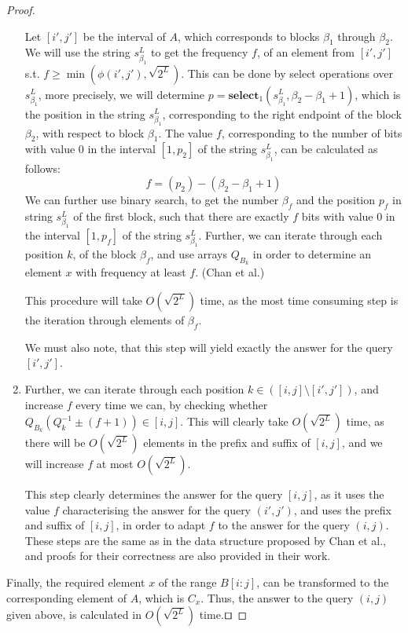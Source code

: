 \documentclass[runningheads]{llncs}
\begin{document}
\begin{proof}
\begin{enumerate}
         Let $[i', j']$ be the interval of $A$, which corresponds to blocks $\beta_1$ through $\beta_2$.
         We will use the string $s^L_{\beta_1}$ to get the frequency $f$, of an element from $[i',j']$ s.t. $f \geq \min( \phi(i',j'),\sqrt{2^L} )$.
         This can be done by select operations over $s^L_{\beta_1}$, more precisely, we will determine $p=\textbf{select}_1(s^L_{\beta_1}, \beta_2-\beta_1+1 )$, 
         which is the position in the string $s^L_{\beta_1}$, corresponding to the right endpoint of the block $\beta_2$, with respect to block $\beta_1$. 
        The value $f$, corresponding to the number of bits with value $0$ in the interval $[1 , p_2]$ of the string $s^L_{\beta_1}$, can be calculated as follows:
         \[
            f = (p_2)-(\beta_2-\beta_1+1)
         \]
        We can further use binary search, to get the number $\beta_f$ and the position $p_f$ in string $s^L_{\beta_1}$ of the first block, such that there are exactly $f$ bits with value $0$ in the interval 
        $[1,  p_f]$ of the string $s^L_{\beta_1}$. 
        Further, we can iterate through each position $k$, of the block $\beta_f$, and use arrays $Q_{B_k}$ in order to determine an element $ x $ with frequency at least $f$. (Chan et al.\cite{chan2014linear}) 

        This procedure will take $O(\sqrt{2^L})$ time, as the most time consuming step is the iteration through elements of $\beta_f$.
         
        We must also note, that this step will yield exactly the answer for the query $[i',j']$.

         \item Further, we can iterate through each position $k\in ([i,j]\setminus [i', j'])$, 
         and increase $f$ every time we can, by checking whether $Q_{B_k}(Q^{-1}_k \pm (f+1) ) \in [i,j]$. This will clearly take $O(\sqrt{2^L} )$ time, as there will be $O(\sqrt{2^L})$ elements in the prefix and suffix of $[i,j]$, and we will 
         increase $f$ at most $O(\sqrt{2^L})$. 

         This step clearly determines the answer for the query $[i,j]$, as it uses the value $f$ characterising the answer for the query $(i',j')$, and uses the prefix and suffix of $[i,j]$, in order to adapt $f$ 
         to the answer for the query $(i,j)$. These steps are the same as in the data structure proposed by Chan et al.\cite{chan2014linear}, and proofs for their correctness are also provided in their work. 

        \end{enumerate}
        
        Finally, the required element $x$ of the range $B[i:j]$, can be transformed to the corresponding element of $A$, which is $C_{ x }$. 
        Thus, the answer to the query $(i,j)$ given above, is calculated in $O(\sqrt{2^L})$ time.$\qed$ 



\end{proof}
\end{document}
